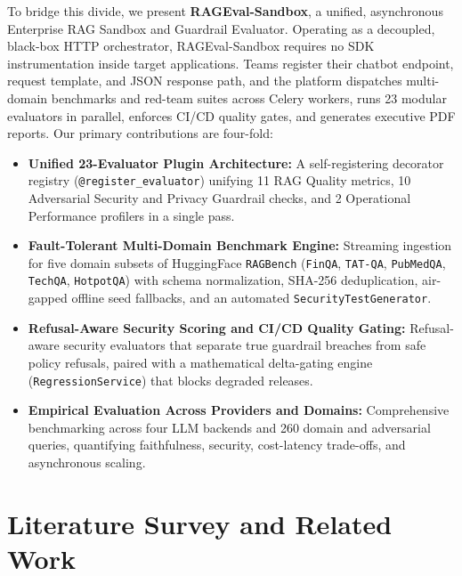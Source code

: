 \documentclass[conference]{IEEEtran}
\begin{document}
To bridge this divide, we present \textbf{RAGEval-Sandbox}, a unified, asynchronous Enterprise RAG Sandbox and Guardrail Evaluator. Operating as a decoupled, black-box HTTP orchestrator, RAGEval-Sandbox requires no SDK instrumentation inside target applications. Teams register their chatbot endpoint, request template, and JSON response path, and the platform dispatches multi-domain benchmarks and red-team suites across Celery workers, runs 23 modular evaluators in parallel, enforces CI/CD quality gates, and generates executive PDF reports. Our primary contributions are four-fold:
\begin{itemize}
    \item \textbf{Unified 23-Evaluator Plugin Architecture:} A self-registering decorator registry (\texttt{@register\_evaluator}) unifying 11 RAG Quality metrics, 10 Adversarial Security and Privacy Guardrail checks, and 2 Operational Performance profilers in a single pass.
    \item \textbf{Fault-Tolerant Multi-Domain Benchmark Engine:} Streaming ingestion for five domain subsets of HuggingFace \texttt{RAGBench} (\texttt{FinQA}, \texttt{TAT-QA}, \texttt{PubMedQA}, \texttt{TechQA}, \texttt{HotpotQA}) with schema normalization, SHA-256 deduplication, air-gapped offline seed fallbacks, and an automated \texttt{SecurityTestGenerator}.
    \item \textbf{Refusal-Aware Security Scoring and CI/CD Quality Gating:} Refusal-aware security evaluators that separate true guardrail breaches from safe policy refusals, paired with a mathematical delta-gating engine (\texttt{RegressionService}) that blocks degraded releases.
    \item \textbf{Empirical Evaluation Across Providers and Domains:} Comprehensive benchmarking across four LLM backends and 260 domain and adversarial queries, quantifying faithfulness, security, cost-latency trade-offs, and asynchronous scaling.
\end{itemize}

\section{Literature Survey and Related Work}
\end{document}

